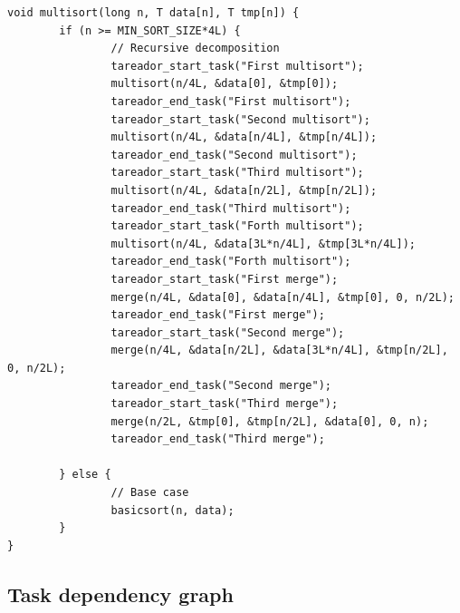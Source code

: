 \documentclass[12]{article}
\begin{document}
\begin{lstlisting}[frame=single]
void multisort(long n, T data[n], T tmp[n]) {
        if (n >= MIN_SORT_SIZE*4L) {
                // Recursive decomposition
                tareador_start_task("First multisort");
                multisort(n/4L, &data[0], &tmp[0]);
                tareador_end_task("First multisort");
                tareador_start_task("Second multisort");
                multisort(n/4L, &data[n/4L], &tmp[n/4L]);
                tareador_end_task("Second multisort");
                tareador_start_task("Third multisort");
                multisort(n/4L, &data[n/2L], &tmp[n/2L]);
                tareador_end_task("Third multisort");
                tareador_start_task("Forth multisort");
                multisort(n/4L, &data[3L*n/4L], &tmp[3L*n/4L]);
                tareador_end_task("Forth multisort");
                tareador_start_task("First merge");
                merge(n/4L, &data[0], &data[n/4L], &tmp[0], 0, n/2L);
                tareador_end_task("First merge");
                tareador_start_task("Second merge");
                merge(n/4L, &data[n/2L], &data[3L*n/4L], &tmp[n/2L], 0, n/2L);
                tareador_end_task("Second merge");
                tareador_start_task("Third merge");
                merge(n/2L, &tmp[0], &tmp[n/2L], &data[0], 0, n);
                tareador_end_task("Third merge");

        } else {
                // Base case
                basicsort(n, data);
        }
}

\end{lstlisting}


\subsection{Task dependency graph}
\end{document}
